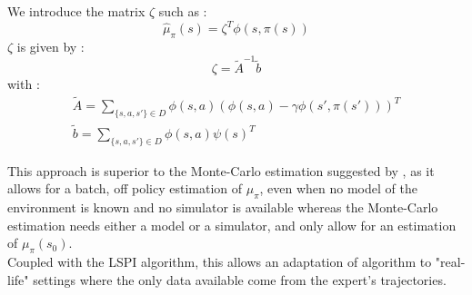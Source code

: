 \documentclass{article}
\begin{document}
We introduce the matrix $\zeta$ such as :
\begin{equation}
\hat \mu_\pi (s) = \zeta^T\phi(s,\pi(s))
\end{equation}
$\zeta$ is given by :
\begin{equation}
\zeta = \tilde A^{-1}\tilde b
\end{equation}
with :
\begin{eqnarray}
\tilde A = \sum_{\{s,a,s'\} \in D}\phi(s,a)\left(\phi(s,a) - \gamma \phi(s',\pi(s'))\right)^T\\
\tilde b = \sum_{\{s,a,s'\} \in D} \phi(s,a)\psi(s)^T
\end{eqnarray}

This approach is superior to the Monte-Carlo estimation suggested by \citet{abbeel2004apprenticeship}, as it allows for a batch, off policy estimation of $\mu_\pi$, even when no model of the environment is known and no simulator is available whereas the Monte-Carlo estimation needs either a model or a simulator, and only allow for an estimation of $\mu_\pi(s_0)$.\\

Coupled with the LSPI algorithm, this allows an adaptation of \citet{abbeel2004apprenticeship} algorithm to "real-life" settings where the only data available come from the expert's trajectories.\\
\end{document}
